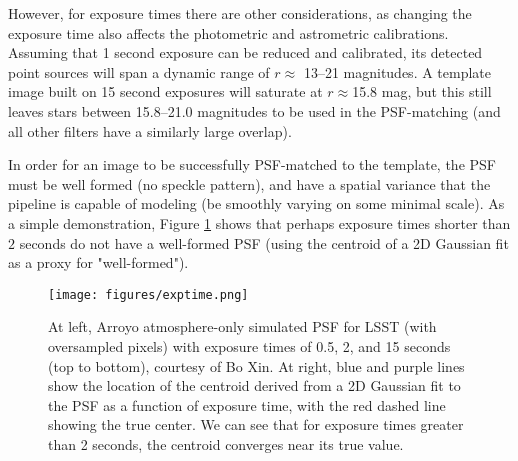 However, for exposure times there are other considerations, as changing the exposure time also affects the photometric and astrometric calibrations.
Assuming that 1 second exposure can be reduced and calibrated, its detected point sources will span a dynamic range of $r$$\approx$ 13--21 magnitudes.
A template image built on 15 second exposures will saturate at $r$$\approx$15.8 mag, but this still leaves stars between 15.8--21.0 magnitudes to be used in the PSF-matching (and all other filters have a similarly large overlap).

In order for an image to be successfully PSF-matched to the template, the PSF must be well formed (no speckle pattern), and have a spatial variance that the pipeline is capable of modeling (be smoothly varying on some minimal scale).
As a simple demonstration, Figure \ref{fig:expt} shows that perhaps exposure times shorter than $2$ seconds do not have a well-formed PSF (using the centroid of a 2D Gaussian fit as a proxy for "well-formed").

\begin{figure}
\begin{center}
\texttt{[image: figures/exptime.png]}
\caption{At left, Arroyo atmosphere-only simulated PSF for LSST (with oversampled pixels) with exposure times of 0.5, 2, and 15 seconds (top to bottom), courtesy of Bo Xin. At right, blue and purple lines show the location of the centroid derived from a 2D Gaussian fit to the PSF as a function of exposure time, with the red dashed line showing the true center. We can see that for exposure times greater than 2 seconds, the centroid converges near its true value. \label{fig:expt}}
\end{center}
\end{figure}


